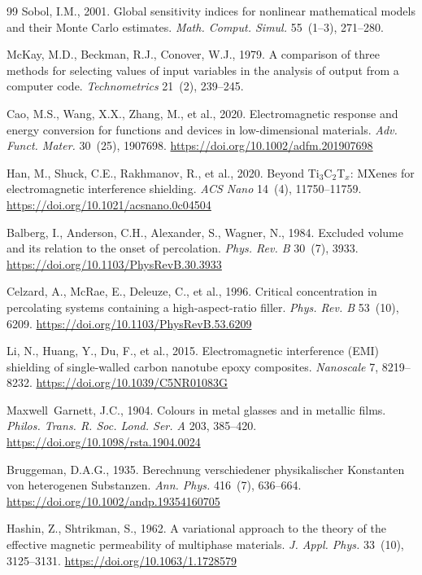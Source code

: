 \documentclass[review,3p,authoryear]{elsarticle}
\begin{document}
\begin{thebibliography}{99}
Sobol, I.M., 2001.
Global sensitivity indices for nonlinear mathematical models and their Monte Carlo estimates.
\textit{Math. Comput. Simul.} 55~(1--3), 271--280.

McKay, M.D., Beckman, R.J., Conover, W.J., 1979.
A comparison of three methods for selecting values of input variables in the analysis of output from a computer code.
\textit{Technometrics} 21~(2), 239--245.

Cao, M.S., Wang, X.X., Zhang, M., et al., 2020.
Electromagnetic response and energy conversion for functions and devices in low-dimensional materials.
\textit{Adv. Funct. Mater.} 30~(25), 1907698.
\url{https://doi.org/10.1002/adfm.201907698}

Han, M., Shuck, C.E., Rakhmanov, R., et al., 2020.
Beyond Ti$_3$C$_2$T$_x$: MXenes for electromagnetic interference shielding.
\textit{ACS Nano} 14~(4), 11750--11759.
\url{https://doi.org/10.1021/acsnano.0c04504}

Balberg, I., Anderson, C.H., Alexander, S., Wagner, N., 1984.
Excluded volume and its relation to the onset of percolation.
\textit{Phys. Rev. B} 30~(7), 3933.
\url{https://doi.org/10.1103/PhysRevB.30.3933}

Celzard, A., McRae, E., Deleuze, C., et al., 1996.
Critical concentration in percolating systems containing a high-aspect-ratio filler.
\textit{Phys. Rev. B} 53~(10), 6209.
\url{https://doi.org/10.1103/PhysRevB.53.6209}

Li, N., Huang, Y., Du, F., et al., 2015.
Electromagnetic interference (EMI) shielding of single-walled carbon nanotube epoxy composites.
\textit{Nanoscale} 7, 8219--8232.
\url{https://doi.org/10.1039/C5NR01083G}

Maxwell~Garnett, J.C., 1904.
Colours in metal glasses and in metallic films.
\textit{Philos. Trans. R. Soc. Lond. Ser. A} 203, 385--420.
\url{https://doi.org/10.1098/rsta.1904.0024}

Bruggeman, D.A.G., 1935.
Berechnung verschiedener physikalischer Konstanten von heterogenen Substanzen.
\textit{Ann. Phys.} 416~(7), 636--664.
\url{https://doi.org/10.1002/andp.19354160705}

Hashin, Z., Shtrikman, S., 1962.
A variational approach to the theory of the effective magnetic permeability of multiphase materials.
\textit{J. Appl. Phys.} 33~(10), 3125--3131.
\url{https://doi.org/10.1063/1.1728579}


\end{thebibliography}
\end{document}
